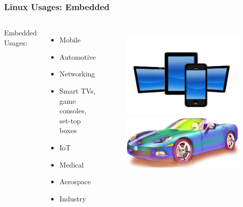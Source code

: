 \documentclass[aspectratio=169]{beamer}
\begin{document}
\begin{frame}
  \frametitle{Linux Usages: Embedded}
  \begin{columns}
    Embedded Usages:
     \begin{itemize}
       \item Mobile
       \item Automotive
       \item Networking
       \item Smart TVs, game consoles, set-top boxes
       \item IoT
       \item Medical
       \item Aerospace
       \item Industry
     \end{itemize}
    \begin{figure}
      \includegraphics[scale=0.04]{images/mobile.jpg}
      \includegraphics[scale=0.4]{images/car.png}

\end{figure}
\end{columns}
\end{frame}
\end{document}
